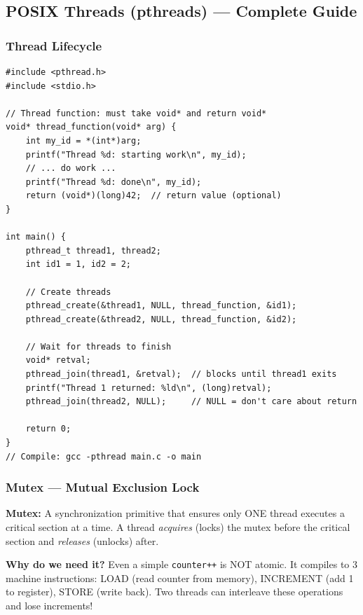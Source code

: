 \documentclass[11pt,a4paper]{article}
\newcommand{\code}[1]{\texttt{\small\colorbox{codebg}{\color{codekw}#1}}}
\begin{document}
\subsection{POSIX Threads (pthreads) --- Complete Guide}

\subsubsection{Thread Lifecycle}

\begin{lstlisting}
#include <pthread.h>
#include <stdio.h>

// Thread function: must take void* and return void*
void* thread_function(void* arg) {
    int my_id = *(int*)arg;
    printf("Thread %d: starting work\n", my_id);
    // ... do work ...
    printf("Thread %d: done\n", my_id);
    return (void*)(long)42;  // return value (optional)
}

int main() {
    pthread_t thread1, thread2;
    int id1 = 1, id2 = 2;
    
    // Create threads
    pthread_create(&thread1, NULL, thread_function, &id1);
    pthread_create(&thread2, NULL, thread_function, &id2);
    
    // Wait for threads to finish
    void* retval;
    pthread_join(thread1, &retval);  // blocks until thread1 exits
    printf("Thread 1 returned: %ld\n", (long)retval);
    pthread_join(thread2, NULL);     // NULL = don't care about return
    
    return 0;
}
// Compile: gcc -pthread main.c -o main
\end{lstlisting}

\subsubsection{Mutex --- Mutual Exclusion Lock}

\begin{mydef}
\textbf{Mutex:} A synchronization primitive that ensures only ONE thread executes a critical section at a time. A thread \textit{acquires} (locks) the mutex before the critical section and \textit{releases} (unlocks) after.
\end{mydef}

\textbf{Why do we need it?} Even a simple \code{counter++} is NOT atomic. It compiles to 3 machine instructions: LOAD (read counter from memory), INCREMENT (add 1 to register), STORE (write back). Two threads can interleave these operations and lose increments!
\end{document}
